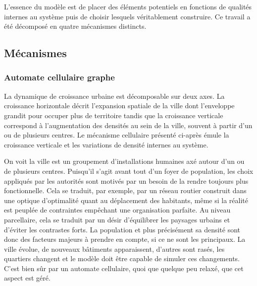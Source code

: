 \documentclass[12pt]{article}
\begin{document}
L'essence du modèle est de placer des éléments potentiels en fonctions
de qualités internes au système puis de choisir lesquels véritablement
construire. Ce travail a été décomposé en quatre mécanismes distincts.

\subsection{Mécanismes}

\subsubsection{Automate cellulaire graphe}

La dynamique de croissance urbaine est décomposable sur deux axes. La
croissance horizontale décrit l'expansion spatiale de la ville dont
l'enveloppe grandit pour occuper plus de territoire tandis que la
croissance verticale correspond à l'augmentation des densités au sein
de la ville, souvent à partir d'un ou de plusieurs centres. Le
mécanisme cellulaire présenté ci-après émule la croissance verticale
et les variations de densité internes au système.

On voit la ville est un groupement d'installations humaines axé autour
d'un ou de plusieurs centres. Puisqu'il s'agit avant tout d'un foyer
de population, les choix appliqués par les autorités sont motivés par
un besoin de la rendre toujours plus fonctionnelle. Cela se traduit,
par exemple, par un réseau routier construit dans une optique
d'optimalité quant au déplacement des habitants, même si la réalité
est peuplée de contraintes empêchant une organisation parfaite. Au
niveau parcellaire, cela se traduit par un désir d'équilibrer les
paysages urbains et d'éviter les contrastes forts. La population et
plus précisément sa densité sont donc des facteurs majeurs à prendre
en compte, si ce ne sont les principaux. La ville évolue, de nouveaux
bâtiments apparaissent, d'autres sont rasés, les quartiers changent et
le modèle doit être capable de simuler ces changements. C'est bien sûr
par un automate cellulaire, quoi que quelque peu relaxé, que cet
aspect est géré.
\end{document}
